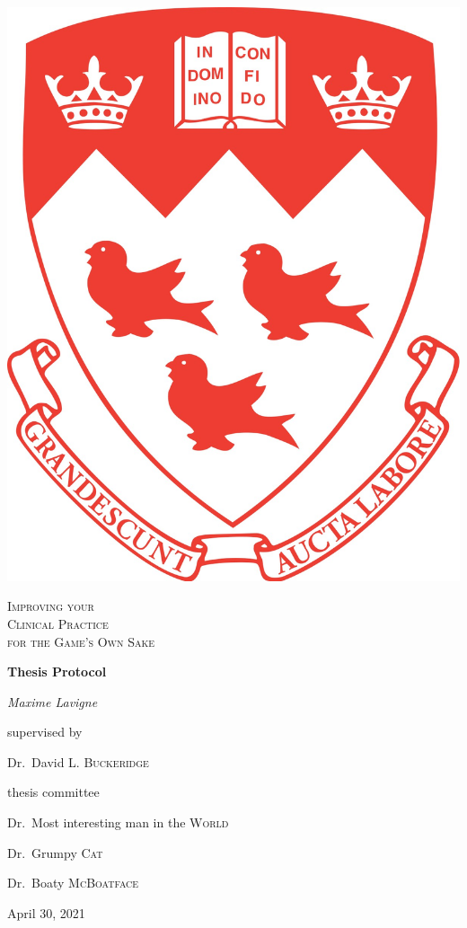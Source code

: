\AtBeginShipoutNext{\AtBeginShipoutNext{\AtBeginShipoutDiscard}}
\begin{titlingpage}

\begin{minipage}[c]{0.23\textwidth}
\raggedright 
\includegraphics[width=0.75\linewidth]{coa.jpg}
\end{minipage}%
\vrule width 2pt
\begin{minipage}[c]{0.73\textwidth}
	\centering
	
	\vspace{5cm}
	{\huge\scshape Improving your\\Clinical Practice \\ \vspace{0.5cm} for the Game's Own Sake}
	
	\vspace{2cm}
	{\Large\bfseries Thesis Protocol\par}
	
	\vspace{2cm}
	{\Large\itshape Maxime Lavigne\par}
	
	\vspace{2cm}
	supervised by\par
	Dr.~David L. \textsc{Buckeridge}
	
	\vspace{2cm}
	thesis committee\par
	Dr.~Most interesting man in the \textsc{World}\par
	Dr.~Grumpy \textsc{Cat}\par
	Dr.~Boaty \textsc{McBoatface}

	\vspace{2cm}
	{\large April 30, 2021\par}
\end{minipage}%

\end{titlingpage}
